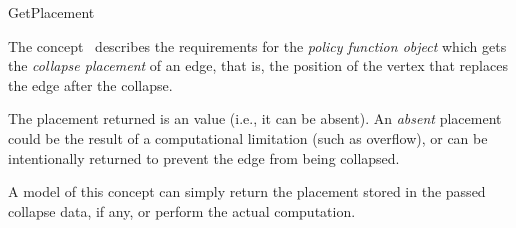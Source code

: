 
\begin{ccRefConcept}{GetPlacement}


\ccDefinition

The concept \ccRefName\ describes the requirements for the {\em policy
function object} which gets the {\em collapse placement} of an edge,
that is, the position of the vertex that replaces the edge after the
collapse.

The placement returned is an  value (i.e., it can
be absent). An {\em absent} placement could be the result of a
computational limitation (such as overflow), or can be intentionally
returned to prevent the edge from being collapsed.

A model of this concept can simply return the placement stored in the
passed collapse data, if any, or perform the actual computation.

\ccRefines
{}

\ccTypes
\ccGlue    
\ccGlue    
\ccGlue    
\ccGlue    

\ccCreation
{}  %


\end{ccRefConcept}

